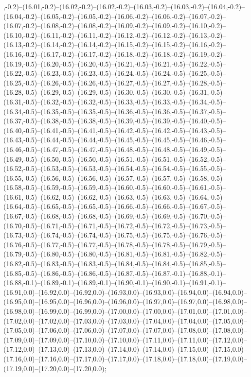 ,-0.2)--(16.01,-0.2)--(16.02,-0.2)--(16.02,-0.2)--(16.03,-0.2)--(16.03,-0.2)--(16.04,-0.2)--(16.04,-0.2)--(16.05,-0.2)--(16.05,-0.2)--(16.06,-0.2)--(16.06,-0.2)--(16.07,-0.2)--(16.07,-0.2)--(16.08,-0.2)--(16.08,-0.2)--(16.09,-0.2)--(16.09,-0.2)--(16.10,-0.2)--(16.10,-0.2)--(16.11,-0.2)--(16.11,-0.2)--(16.12,-0.2)--(16.12,-0.2)--(16.13,-0.2)--(16.13,-0.2)--(16.14,-0.2)--(16.14,-0.2)--(16.15,-0.2)--(16.15,-0.2)--(16.16,-0.2)--(16.16,-0.2)--(16.17,-0.2)--(16.17,-0.2)--(16.18,-0.2)--(16.18,-0.2)--(16.19,-0.2)--(16.19,-0.5)--(16.20,-0.5)--(16.20,-0.5)--(16.21,-0.5)--(16.21,-0.5)--(16.22,-0.5)--(16.22,-0.5)--(16.23,-0.5)--(16.23,-0.5)--(16.24,-0.5)--(16.24,-0.5)--(16.25,-0.5)--(16.25,-0.5)--(16.26,-0.5)--(16.26,-0.5)--(16.27,-0.5)--(16.27,-0.5)--(16.28,-0.5)--(16.28,-0.5)--(16.29,-0.5)--(16.29,-0.5)--(16.30,-0.5)--(16.30,-0.5)--(16.31,-0.5)--(16.31,-0.5)--(16.32,-0.5)--(16.32,-0.5)--(16.33,-0.5)--(16.33,-0.5)--(16.34,-0.5)--(16.34,-0.5)--(16.35,-0.5)--(16.35,-0.5)--(16.36,-0.5)--(16.36,-0.5)--(16.37,-0.5)--(16.37,-0.5)--(16.38,-0.5)--(16.38,-0.5)--(16.39,-0.5)--(16.39,-0.5)--(16.40,-0.5)--(16.40,-0.5)--(16.41,-0.5)--(16.41,-0.5)--(16.42,-0.5)--(16.42,-0.5)--(16.43,-0.5)--(16.43,-0.5)--(16.44,-0.5)--(16.44,-0.5)--(16.45,-0.5)--(16.45,-0.5)--(16.46,-0.5)--(16.46,-0.5)--(16.47,-0.5)--(16.47,-0.5)--(16.48,-0.5)--(16.48,-0.5)--(16.49,-0.5)--(16.49,-0.5)--(16.50,-0.5)--(16.50,-0.5)--(16.51,-0.5)--(16.51,-0.5)--(16.52,-0.5)--(16.52,-0.5)--(16.53,-0.5)--(16.53,-0.5)--(16.54,-0.5)--(16.54,-0.5)--(16.55,-0.5)--(16.55,-0.5)--(16.56,-0.5)--(16.56,-0.5)--(16.57,-0.5)--(16.57,-0.5)--(16.58,-0.5)--(16.58,-0.5)--(16.59,-0.5)--(16.59,-0.5)--(16.60,-0.5)--(16.60,-0.5)--(16.61,-0.5)--(16.61,-0.5)--(16.62,-0.5)--(16.62,-0.5)--(16.63,-0.5)--(16.63,-0.5)--(16.64,-0.5)--(16.64,-0.5)--(16.65,-0.5)--(16.65,-0.5)--(16.66,-0.5)--(16.66,-0.5)--(16.67,-0.5)--(16.67,-0.5)--(16.68,-0.5)--(16.68,-0.5)--(16.69,-0.5)--(16.69,-0.5)--(16.70,-0.5)--(16.70,-0.5)--(16.71,-0.5)--(16.71,-0.5)--(16.72,-0.5)--(16.72,-0.5)--(16.73,-0.5)--(16.73,-0.5)--(16.74,-0.5)--(16.74,-0.5)--(16.75,-0.5)--(16.75,-0.5)--(16.76,-0.5)--(16.76,-0.5)--(16.77,-0.5)--(16.77,-0.5)--(16.78,-0.5)--(16.78,-0.5)--(16.79,-0.5)--(16.79,-0.5)--(16.80,-0.5)--(16.80,-0.5)--(16.81,-0.5)--(16.81,-0.5)--(16.82,-0.5)--(16.82,-0.5)--(16.83,-0.5)--(16.83,-0.5)--(16.84,-0.5)--(16.84,-0.5)--(16.85,-0.5)--(16.85,-0.5)--(16.86,-0.5)--(16.86,-0.5)--(16.87,-0.5)--(16.87,-0.1)--(16.88,-0.1)--(16.88,-0.1)--(16.89,-0.1)--(16.89,-0.1)--(16.90,-0.1)--(16.90,-0.1)--(16.91,-0.1)--(16.91,0.0)--(16.92,0.0)--(16.92,0.0)--(16.93,0.0)--(16.93,0.0)--(16.94,0.0)--(16.94,0.0)--(16.95,0.0)--(16.95,0.0)--(16.96,0.0)--(16.96,0.0)--(16.97,0.0)--(16.97,0.0)--(16.98,0.0)--(16.98,0.0)--(16.99,0.0)--(16.99,0.0)--(17.00,0.0)--(17.00,0.0)--(17.01,0.0)--(17.01,0.0)--(17.02,0.0)--(17.02,0.0)--(17.03,0.0)--(17.03,0.0)--(17.04,0.0)--(17.04,0.0)--(17.05,0.0)--(17.05,0.0)--(17.06,0.0)--(17.06,0.0)--(17.07,0.0)--(17.07,0.0)--(17.08,0.0)--(17.08,0.0)--(17.09,0.0)--(17.09,0.0)--(17.10,0.0)--(17.10,0.0)--(17.11,0.0)--(17.11,0.0)--(17.12,0.0)--(17.12,0.0)--(17.13,0.0)--(17.13,0.0)--(17.14,0.0)--(17.14,0.0)--(17.15,0.0)--(17.15,0.0)--(17.16,0.0)--(17.16,0.0)--(17.17,0.0)--(17.17,0.0)--(17.18,0.0)--(17.18,0.0)--(17.19,0.0)--(17.19,0.0)--(17.20,0.0)--(17.20,0.0);